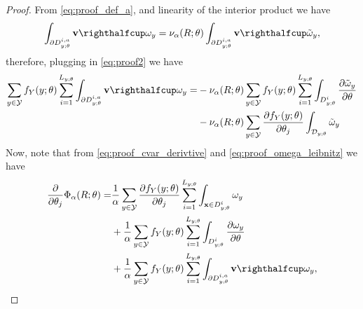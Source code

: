 \documentclass[letterpaper]{article}
\newcommand{\cvar}{\Phi_\alpha}
\newcommand{\var}{\nu_\alpha}
\newcommand{\cD}{\mathcal{D}}
\newcommand{\cY}{\mathcal{Y}}
\newcommand{\bx}{\mathbf{x}}
\newcommand{\bX}{\mathbf{X}}
\newcommand{\Dth}{\frac{\partial}{\partial \theta_j}}
\newcommand{\Dt}[1]{\frac{\partial {#1}}{\partial \theta_j}}
\begin{document}
\begin{proof}
From \eqref{eq:proof_def_a}, and linearity of the interior product we have
\begin{equation*}
\int_{\partial D_{y;\theta}^{i,a}} \mathbf{v} \righthalfcup \omega_y = \var (R;\theta) \int_{\partial D_{y;\theta}^{i,a}} \mathbf{v} \righthalfcup \tilde{\omega}_y,
\end{equation*}
therefore, plugging in \eqref{eq:proof2} we have
\begin{equation}\label{eq:proof3}
\begin{split}
\sum_{y\in \cY}f_Y(y;\theta) \sum_{i=1}^{L_{y;\theta}}\int_{\partial D_{y;\theta}^{i,a}} \mathbf{v} \righthalfcup \omega_y =& -\var (R;\theta) \sum_{y\in \cY}f_Y(y;\theta) \sum_{i=1}^{L_{y;\theta}}\int_{D_{y;\theta}^i} \frac{\partial \tilde{\omega}_y}{\partial \theta} \\
&  -\var (R;\theta) \sum_{y\in \cY}\Dt{f_Y(y;\theta)} \int_{\cD_{y;\theta}} \tilde{\omega}_y
\end{split}
\end{equation}
Now, note that from \eqref{eq:proof_cvar_derivtive} and \eqref{eq:proof_omega_leibnitz} we have
\begin{equation*}
\begin{split}
\Dth \cvar (R;\theta) =& \frac{1}{\alpha} \sum_{y\in \cY}\Dt{f_Y(y;\theta)} \sum_{i=1}^{L_{y;\theta}}\int_{\bx \in D_{y;\theta}^i} \omega_y \\
&+ \frac{1}{\alpha} \sum_{y\in \cY}f_Y(y;\theta) \sum_{i=1}^{L_{y;\theta}} \int_{D_{y;\theta}^i} \frac{\partial \omega_y}{\partial \theta}\\
&+ \frac{1}{\alpha} \sum_{y\in \cY}f_Y(y;\theta) \sum_{i=1}^{L_{y;\theta}} \int_{\partial D_{y;\theta}^{i,a}} \mathbf{v} \righthalfcup \omega_y,
\end{split}
\end{equation*}

\end{proof}
\end{document}
